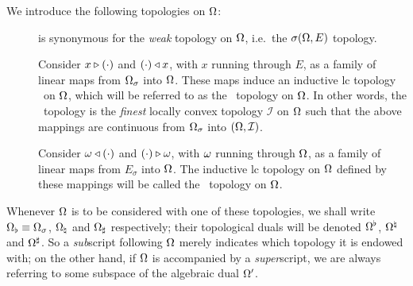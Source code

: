 \begin{defn}  \label{def:three_topologies}
 We introduce the following topologies on $\Omega$:
 \begin{description}
  \item[\strictw]
   is synonymous for the {\em weak\/} topology on $\Omega$, i.e.\ the $\sigma(\Omega,E)$ topology.
  \item[\strictm]
   Consider $x \triangleright (\cdot)$ and $(\cdot) \triangleleft x$, with $x$ running through $E$,
   as a family of linear maps from $\Omega_\sigma$ into $\Omega$\@.
   These maps induce an inductive {\sc lc} topology \mbox{\cite[\S 6.6]{Jarchow}}\
   on $\Omega$, which will be referred to as the {\em \strictm}\ topology on $\Omega$.
   In other words, the \strictm\ topology is the {\em finest\/} locally convex
   topology ${\mathcal I}$ on $\Omega$ such that the above mappings are continuous
   from $\Omega_\sigma$ into $(\Omega,{\mathcal I})$.
  \item[\stricta]
   Consider $\omega \triangleleft (\cdot)$ and $(\cdot) \triangleright \omega$, with $\omega$ running through $\Omega$,
   as a family of linear maps from $E_\sigma$ into $\Omega$.
   The inductive {\sc lc} topology on $\Omega$ defined by these mappings
   will be called the {\em\stricta}\ topology on $\Omega$.
 \end{description}
 Whenever $\Omega$ is to be considered with one of these topologies,
 we shall write $\Omega_\flat\equiv\Omega_\sigma$, $\Omega_\natural$ and $\Omega_\sharp$ respectively;
 their topological duals will be denoted $\Omega^\flat$, $\Omega^\natural$ and $\Omega^\sharp$.
 So a {\em sub\/}script following $\Omega$ merely indicates which topology
 it is endowed with; on the other hand, if $\Omega$ is accompanied by a {\em super\/}script,
 we are always referring to some subspace of the algebraic dual $\Omega'$.
\end{defn}


